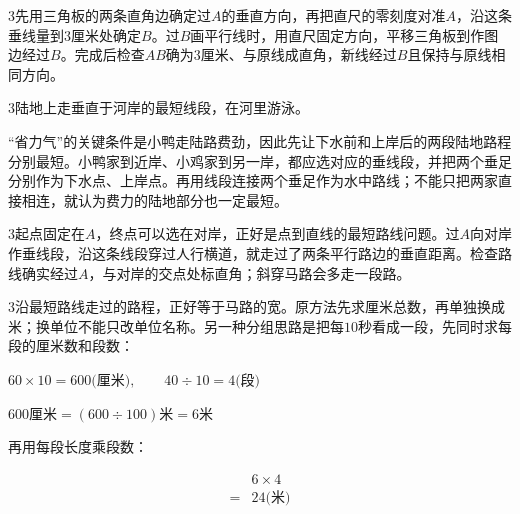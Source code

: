 \documentclass[multi=snippet,border={5bp 20bp 5bp 5bp}]{standalone}
\newenvironment{snippet}[3]{\begin{minipage}{#1bp}\color{answerred}\fontsize{#2}{#3}\selectfont\raggedright}{\end{minipage}}
\begin{document}
\begin{snippet}{505}{11.5}{14}\begin{multicols}{3}\raggedcolumns 先用三角板的两条直角边确定过\(A\)\allowbreak 的垂直方向，再把直尺的零刻度对准\(A\)\allowbreak ，沿这条垂线量到\(3\)\allowbreak 厘米处确定\(B\)\allowbreak 。过\(B\)\allowbreak 画平行线时，用直尺固定方向，平移三角板到作图边经过\(B\)\allowbreak 。完成后检查\(AB\)\allowbreak 确为\(3\)\allowbreak 厘米、与原线成直角，新线经过\(B\)\allowbreak 且保持与原线相同方向。\end{multicols}\end{snippet}
\begin{snippet}{505}{11.5}{14}\begin{multicols}{3}\raggedcolumns 陆地上走垂直于河岸的最短线段，在河里游泳。\par “省力气”的关键条件是小鸭走陆路费劲，因此先让下水前和上岸后的两段陆地路程分别最短。小鸭家到近岸、小鸡家到另一岸，都应选对应的垂线段，并把两个垂足分别作为下水点、上岸点。再用线段连接两个垂足作为水中路线；不能只把两家直接相连，就认为费力的陆地部分也一定最短。\end{multicols}\end{snippet}
\begin{snippet}{505}{11.5}{14}\begin{multicols}{3}\raggedcolumns 起点固定在\(A\)\allowbreak ，终点可以选在对岸，正好是点到直线的最短路线问题。过\(A\)\allowbreak 向对岸作垂线段，沿这条线段穿过人行横道，就走过了两条平行路边的垂直距离。检查路线确实经过\(A\)\allowbreak ，与对岸的交点处标直角；斜穿马路会多走一段路。\end{multicols}\end{snippet}
\begin{snippet}{505}{11.5}{14}\begin{multicols}{3}\raggedcolumns 沿最短路线走过的路程，正好等于马路的宽。原方法先求厘米总数，再单独换成米；换单位不能只改单位名称。另一种分组思路是把每\(10\)\allowbreak 秒看成一段，先同时求每段的厘米数和段数：\par\noindent\(\displaystyle 60\times10=600\text{(厘米)},\allowbreak \qquad40\div10=4\text{(段)}\)\allowbreak \par \noindent\(\displaystyle 600\text{厘米}=(600\div100)\text{米}=6\text{米}\)\allowbreak \par 再用每段长度乘段数：\par\noindent\[\displaystyle \begin{aligned}&6\times4\\={}&24\text{(米)}\end{aligned}\]\par\end{multicols}\end{snippet}
\end{document}
